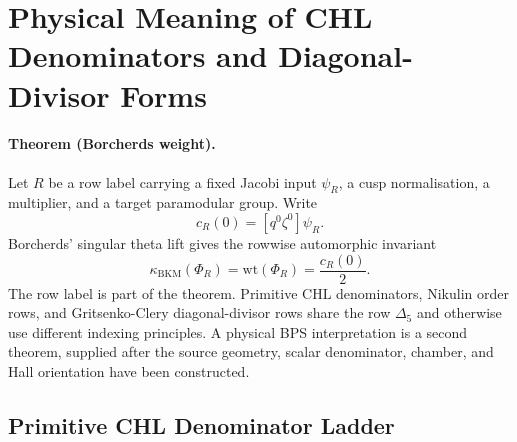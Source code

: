 \providecommand{\ZZ}{\mathbb{Z}}
\providecommand{\QQ}{\mathbb{Q}}
\providecommand{\CC}{\mathbb{C}}
\providecommand{\cO}{\mathcal{O}}
\providecommand{\Sp}{\mathrm{Sp}}
\providecommand{\wt}{\mathrm{wt}}
\providecommand{\Aut}{\mathrm{Aut}}
\providecommand{\CoHA}{\mathrm{CoHA}}
\providecommand{\BPS}{\mathrm{BPS}}
\providecommand{\CHL}{\mathrm{CHL}}
\providecommand{\DT}{\mathrm{DT}}
\providecommand{\kBKM}{\kappa_{\mathrm{BKM}}}
\providecommand{\kch}{\kappa_{\mathrm{ch}}}
\providecommand{\kcat}{\kappa_{\mathrm{cat}}}
\providecommand{\kfib}{\kappa_{\mathrm{fiber}}}
\providecommand{\DeltaFive}{\Delta_5}
\providecommand{\PhiTen}{\Phi_{10}^{\mathrm{un}}}
\providecommand{\PhiTenOP}{\Phi_{10}^{\mathrm{OP}}}
\providecommand{\Dfive}{D_5}
\providecommand{\ZOP}{Z_{\mathrm{OP}}}
\providecommand{\Yplus}{Y^+}
\providecommand{\Winfty}{\mathcal{W}_{1+\infty}}

\section*{Physical Meaning of CHL Denominators and Diagonal-Divisor Forms}
\label{wn:sec:physical-meaning-chl-dd-forms}

\paragraph{Theorem (Borcherds weight).}
Let \(R\) be a row label carrying a fixed Jacobi input \(\psi_R\), a
cusp normalisation, a multiplier, and a target paramodular group.  Write
\[
  c_R(0)=[q^0\zeta^0]\psi_R .
\]
Borcherds' singular theta lift gives the rowwise automorphic invariant
\[
  \kBKM(\Phi_R)=\wt(\Phi_R)=\frac{c_R(0)}{2}.
\]
The row label is part of the theorem.  Primitive \(\CHL\) denominators,
Nikulin order rows, and Gritsenko-Clery diagonal-divisor rows share the
row \(\DeltaFive\) and otherwise use different indexing principles.
A physical BPS interpretation is a second theorem, supplied after the
source geometry, scalar denominator, chamber, and Hall orientation have
been constructed.

\subsection*{Primitive CHL Denominator Ladder}

